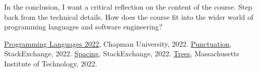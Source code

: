 \documentclass{article}
\theoremstyle{theorem}
\theoremstyle{definition}
\theoremstyle{remark}
\begin{document}
In the conclusion, I want a critical reflection on the content of the course. Step back from the technical details. How does the course fit into the wider world of programming languages and software engineering?

\begin{thebibliography}{99}
 \href{https://github.com/alexhkurz/programming-languages-2022/blob/main/README.md}{Programming Languages 2022}, Chapman University, 2022.
 \href{https://tex.stackexchange.com/questions/2369/why-do-the-less-than-symbol-and-the-greater-than-symbol-appear-wrong-as}{Punctuation}, StackExchange, 2022.
 \href{https://tex.stackexchange.com/questions/14526/spaces-behind-textgreater-not-working-as-expected}{Spacing}, StackExchange, 2022.
 \href{http://sznfong.scripts.mit.edu/site/wp-content/uploads/2018/03/treedrawingtutorialv2.pdf}{Trees}, Massachusetts Institute of Technology, 2022.
\end{thebibliography}
\end{document}
